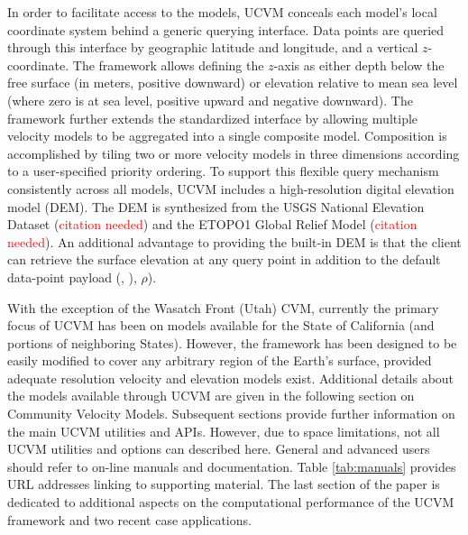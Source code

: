 In order to facilitate access to the models, UCVM conceals each model's local coordinate system behind a generic querying interface. Data points are queried through this interface by geographic latitude and longitude, and a vertical $z$-coordinate. The framework allows defining the $z$-axis as either depth below the free surface (in meters, positive downward) or elevation relative to mean sea level (where zero is at sea level, positive upward and negative downward). The framework further extends the standardized interface by allowing multiple velocity models to be aggregated into a single composite model. Composition is accomplished by tiling two or more velocity models in three dimensions according to a user-specified priority ordering. To support this flexible query mechanism consistently across all models, UCVM includes a high-resolution digital elevation model (DEM). The DEM is synthesized from the USGS National Elevation Dataset (\textcolor{red}{citation needed}) and the ETOPO1 Global Relief Model (\textcolor{red}{citation needed}). An additional advantage to providing the built-in DEM is that the client can retrieve the surface elevation at any query point in addition to the default data-point payload (\vp{}, \vs{}), $\rho$).

With the exception of the Wasatch Front (Utah) CVM, currently the primary focus of UCVM has been on models available for the State of California (and portions of neighboring States). However, the framework has been designed to be easily modified to cover any arbitrary region of the Earth's surface, provided adequate resolution velocity and elevation models exist. Additional details about the models available through UCVM are given in the following section on Community Velocity Models. Subsequent sections provide further information on the main UCVM utilities and APIs. However, due to space limitations, not all UCVM utilities and options can described here. General and advanced users should refer to on-line manuals and documentation. Table \ref{tab:manuals} provides URL addresses linking to supporting material. The last section of the paper is dedicated to additional aspects on the computational performance of the UCVM framework and two recent case applications. 







